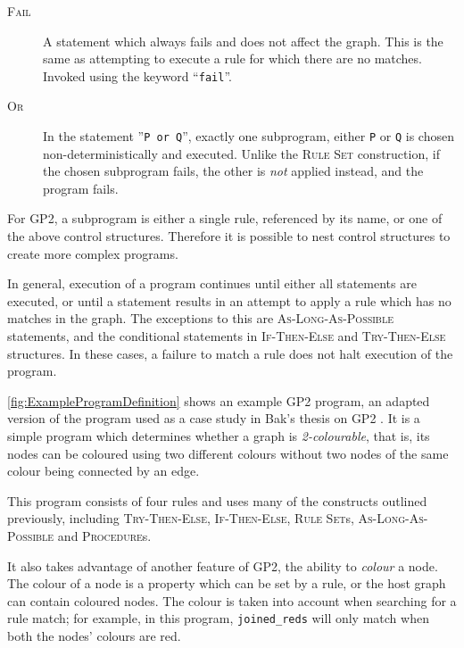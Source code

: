 \documentclass[authoryearcitations]{UoYCSproject}
\begin{document}
\begin{description}
    \item[\textsc{Fail}]
    A statement which always fails and does not affect the graph. This is the same
    as attempting to execute a rule for which there are no matches. Invoked using
    the keyword ``\texttt{fail}''.

    \item[\textsc{Or}]
    In the statement ''\texttt{P or Q}'', exactly one subprogram, either \texttt{P}
    or \texttt{Q} is chosen non-deterministically and executed. Unlike the
    \textsc{Rule Set} construction, if the chosen subprogram fails, the other is
    \emph{not} applied instead, and the program fails.
\end{description}

For GP2, a subprogram is either a single rule, referenced by its name, or one of
the above control structures. Therefore it is possible to nest control structures
to create more complex programs.

In general, execution of a program continues until either all statements are
executed, or until a statement results in an attempt to apply a rule which has
no matches in the graph. The exceptions to this are \textsc{As-Long-As-Possible}
statements, and the conditional statements in \textsc{If-Then-Else} and
\textsc{Try-Then-Else} structures. In these cases, a failure to match a rule
does not halt execution of the program.

\autoref{fig:ExampleProgramDefinition} shows an example GP2 program, an adapted
version of the program used as a case study in Bak's thesis on GP2 \citep[p.126]{bak2015}.
It is a simple program which determines whether a graph is \emph{2-colourable},
that is, its nodes can be coloured using two different colours without two nodes
of the same colour being connected by an edge.

This program consists of four rules and uses many of the constructs outlined
previously, including \textsc{Try-Then-Else}, \textsc{If-Then-Else},
\textsc{Rule Set}s, \textsc{As-Long-As-Possible} and \textsc{Procedure}s.

It also takes advantage of another feature of GP2, the ability to \emph{colour}
a node. The colour of a node is a property which can be set by a rule, or the
host graph can contain coloured nodes. The colour is taken into account when
searching for a rule match; for example, in this program, \texttt{joined\_reds}
will only match when both the nodes' colours are red.
\end{document}
